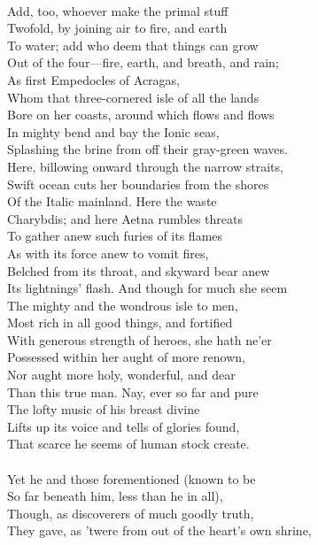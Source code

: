 \\
Add, too, whoever make the primal stuff\\
Twofold, by joining air to fire, and earth\\
To water; add who deem that things can grow\\
Out of the four—fire, earth, and breath, and rain;\\
As first Empedocles of Acragas,\\
Whom that three-cornered isle of all the lands\\
Bore on her coasts, around which flows and flows\\
In mighty bend and bay the Ionic seas,\\
Splashing the brine from off their gray-green waves.\\
Here, billowing onward through the narrow straits,\\
Swift ocean cuts her boundaries from the shores\\
Of the Italic mainland. Here the waste\\
Charybdis; and here Aetna rumbles threats\\
To gather anew such furies of its flames\\
As with its force anew to vomit fires,\\
Belched from its throat, and skyward bear anew\\
Its lightnings' flash. And though for much she seem\\
The mighty and the wondrous isle to men,\\
Most rich in all good things, and fortified\\
With generous strength of heroes, she hath ne'er\\
Possessed within her aught of more renown,\\
Nor aught more holy, wonderful, and dear\\
Than this true man. Nay, ever so far and pure\\
The lofty music of his breast divine\\
Lifts up its voice and tells of glories found,\\
That scarce he seems of human stock create.\\
\\
Yet he and those forementioned (known to be\\
So far beneath him, less than he in all),\\
Though, as discoverers of much goodly truth,\\
They gave, as 'twere from out of the heart's own shrine,\\
